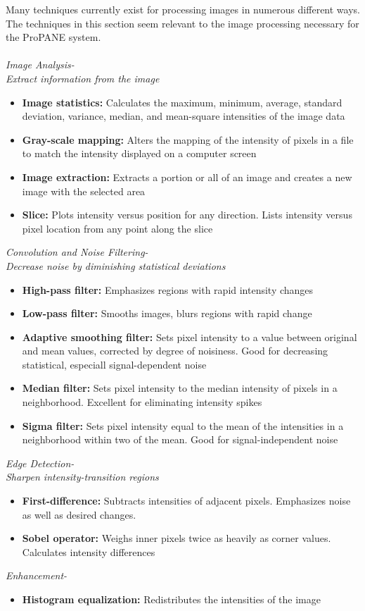 \documentclass{article}
\begin{document}
\noindent Many techniques currently exist for processing images in numerous different ways.  The techniques in this section seem relevant to the image processing necessary for the ProPANE system. \cite{ndt} \\ \\
{\sl Image Analysis- \\ \indent Extract information from the image} 
			\begin{itemize} 
				\item{\textbf{Image statistics:}} Calculates the maximum, minimum, average, standard deviation, variance, median, and mean-square intensities of the image data					
				\item{\textbf{Gray-scale mapping:}} Alters the mapping of the intensity of pixels in a file to match the intensity displayed on a computer screen 
				\item{\textbf{Image extraction:}} Extracts a portion or all of an image and creates a new image with the selected area 
				\item{\textbf{Slice:}} Plots intensity versus position for any direction. Lists intensity versus pixel location from any point along the slice
			\end{itemize} 
{\sl Convolution and Noise Filtering- \\ \indent Decrease noise by diminishing statistical deviations}
			\begin{itemize}
				\item{\textbf{High-pass filter:}} Emphasizes regions with rapid intensity changes
				\item{\textbf{Low-pass filter:}} Smooths images, blurs regions with rapid change
				\item{\textbf{Adaptive smoothing filter:}} Sets pixel intensity to a value between original and mean values, corrected by degree of noisiness. Good for decreasing statistical, especiall signal-dependent noise
				\item{\textbf{Median filter:}} Sets pixel intensity to the median intensity of pixels in a neighborhood. Excellent for eliminating intensity spikes
				\item{\textbf{Sigma filter:}} Sets pixel intensity equal to the mean of the intensities in a neighborhood within two of the mean.  Good for signal-independent noise
			\end{itemize}
{\sl Edge Detection- \\ \indent Sharpen intensity-transition regions}	
			\begin{itemize}
				\item{\textbf{First-difference:}} Subtracts intensities of adjacent pixels.  Emphasizes noise as well as desired changes. 
				\item{\textbf{Sobel operator:}} Weighs inner pixels twice as heavily as corner values.  Calculates intensity differences
			\end{itemize}
{\sl Enhancement- }
			\begin{itemize}
				\item{\textbf{Histogram equalization:}} Redistributes the intensities of the image
			\end{itemize}
\end{document}
